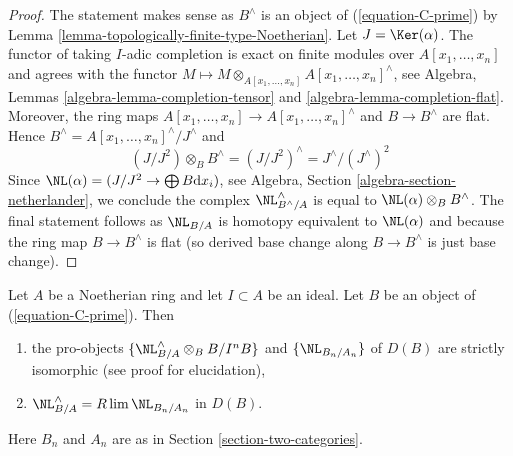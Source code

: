 \begin{proof}
The statement makes sense as $B^\wedge$ is an object of
(\ref{equation-C-prime}) by
Lemma \ref{lemma-topologically-finite-type-Noetherian}.
Let $J = \Ker(\alpha)$. The functor of taking
$I$-adic completion is exact on finite modules over
$A[x_1, \ldots, x_n]$ and agrees with the functor
$M \mapsto M \otimes_{A[x_1, \ldots, x_n]} A[x_1, \ldots, x_n]^\wedge$, see
Algebra, Lemmas \ref{algebra-lemma-completion-tensor} and
\ref{algebra-lemma-completion-flat}. Moreover, the ring maps
$A[x_1, \ldots, x_n] \to A[x_1, \ldots, x_n]^\wedge$
and $B \to B^\wedge$ are flat. Hence
$B^\wedge = A[x_1, \ldots, x_n]^\wedge / J^\wedge$ and
$$
(J/J^2) \otimes_B B^\wedge = (J/J^2)^\wedge = J^\wedge/(J^\wedge)^2
$$
Since $\NL(\alpha) = (J/J^2 \to \bigoplus B\text{d}x_i)$,
see Algebra, Section \ref{algebra-section-netherlander},
we conclude the complex $\NL_{B^\wedge/A}^\wedge$ is equal
to $\NL(\alpha) \otimes_B B^\wedge$. The final statement
follows as $\NL_{B/A}$ is homotopy equivalent to $\NL(\alpha)$
and because the ring map $B \to B^\wedge$ is flat (so derived
base change along $B \to B^\wedge$ is just base change).
\end{proof}

\begin{lemma}
\label{lemma-NL-is-limit}
Let $A$ be a Noetherian ring and let $I \subset A$ be an ideal.
Let $B$ be an object of (\ref{equation-C-prime}). Then
\begin{enumerate}
\item the pro-objects
$\{\NL_{B/A}^\wedge \otimes_B B/I^nB\}$ and $\{\NL_{B_n/A_n}\}$
of $D(B)$ are strictly isomorphic (see proof for elucidation),
\item $\NL_{B/A}^\wedge = R\lim \NL_{B_n/A_n}$ in $D(B)$.
\end{enumerate}
Here $B_n$ and $A_n$ are as in Section \ref{section-two-categories}.
\end{lemma}


